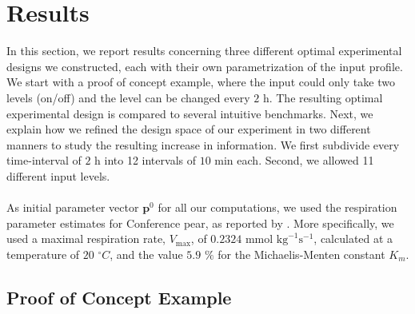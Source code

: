 \section{Results}
\label{Results}
In this section, we report results concerning three different optimal experimental designs we constructed, each with their own parametrization of the input profile. We start with a proof of concept example, where the input could only take two levels (on/off) and the level can be changed every $2 \text{ h}$. The resulting optimal experimental  design is compared to several intuitive benchmarks. Next, we explain how we refined the design space of our experiment in two different manners to study the resulting increase in information. We first subdivide every time-interval of $2 \text{ h}$ into 12 intervals of $10 \text{ min}$ each. Second, we allowed 11 different input levels.
\\
\\
As initial parameter vector $\mathbf{p}^0$ for all our computations, we used the respiration parameter estimates for Conference pear, as reported by \textcite{lammertyn1}. More specifically, we used a maximal respiration rate, $V_{\text{max}}$, of $0.2324 \text{ mmol kg}^{-1}\text{s}^{-1}$, calculated at a temperature of $20$ $^\circ C$, and the value $5.9$ $\%$ for the Michaelis-Menten constant $K_m$.
\subsection{Proof of Concept Example}
\label{Experiment1}
